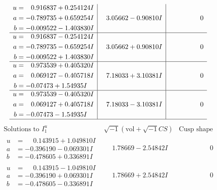 \documentclass[1p]{elsarticle_modified}
\theoremstyle{definition}
\newcommand{\I}{\sqrt{-1}}
\begin{document}
$$\begin{array}{c|c|c}
\begin{aligned}
u &= \phantom{-}0.916837 + 0.254124 I \\
a &= -0.789735 + 0.659254 I \\
b &= -0.009522 - 1.403830 I\end{aligned}
 & \phantom{-}3.05662 - 0.90810 I & \phantom{-0.000000 } 0 \\ \hline\begin{aligned}
u &= \phantom{-}0.916837 - 0.254124 I \\
a &= -0.789735 - 0.659254 I \\
b &= -0.009522 + 1.403830 I\end{aligned}
 & \phantom{-}3.05662 + 0.90810 I & \phantom{-0.000000 } 0 \\ \hline\begin{aligned}
u &= \phantom{-}0.973539 + 0.405320 I \\
a &= \phantom{-}0.069127 - 0.405718 I \\
b &= -0.07473 + 1.54935 I\end{aligned}
 & \phantom{-}7.18033 + 3.10381 I & \phantom{-0.000000 } 0 \\ \hline\begin{aligned}
u &= \phantom{-}0.973539 - 0.405320 I \\
a &= \phantom{-}0.069127 + 0.405718 I \\
b &= -0.07473 - 1.54935 I\end{aligned}
 & \phantom{-}7.18033 - 3.10381 I & \phantom{-0.000000 } 0\\
 \hline 
 \end{array}$$\newpage$$\begin{array}{c|c|c}  
\text{Solutions to }I^u_{1}& \I (\text{vol} + \sqrt{-1}CS) & \text{Cusp shape}\\
 \hline 
\begin{aligned}
u &= \phantom{-}0.143915 + 1.049810 I \\
a &= -0.396190 - 0.069301 I \\
b &= -0.478605 + 0.336891 I\end{aligned}
 & \phantom{-}1.78669 - 2.54842 I & \phantom{-0.000000 } 0 \\ \hline\begin{aligned}
u &= \phantom{-}0.143915 - 1.049810 I \\
a &= -0.396190 + 0.069301 I \\
b &= -0.478605 - 0.336891 I\end{aligned}
 & \phantom{-}1.78669 + 2.54842 I & \phantom{-0.000000 } 0 \\ \hline\begin{aligned}

\end{aligned}
\end{array}$$
\end{document}
